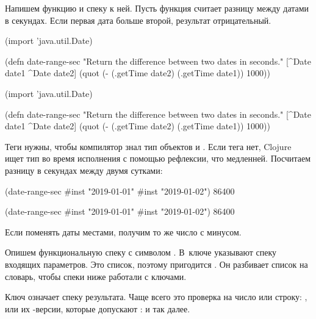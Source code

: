 
Напишем функцию и спеку к ней. Пусть функция считает разницу между датами в
секундах. Если первая дата больше второй, результат отрицательный.

\ifnarrow

\begin{clojure}
(import 'java.util.Date)

(defn date-range-sec
  "Return the difference
           between two dates in seconds."
  [^Date date1 ^Date date2]
  (quot (- (.getTime date2)
           (.getTime date1))
        1000))
\end{clojure}

\else

\begin{clojure}
(import 'java.util.Date)

(defn date-range-sec
  "Return the difference between two dates in seconds."
  [^Date date1 ^Date date2]
  (quot (- (.getTime date2)
           (.getTime date1))
        1000))
\end{clojure}

\fi

Теги  нужны, чтобы компилятор знал тип объектов  и
. Если тега нет, Clojure ищет тип во время исполнения с помощью
рефлексии, что медленней. Посчитаем разницу в секундах между двумя сутками:

\ifnarrow

\begin{clojure}
(date-range-sec #inst "2019-01-01"
                #inst "2019-01-02")
86400
\end{clojure}

\else

\begin{clojure}
(date-range-sec #inst "2019-01-01" #inst "2019-01-02")
86400
\end{clojure}

\fi

\noindent
Если поменять даты местами, получим то же число с минусом.

Опишем функциональную спеку с символом . В~ключе
 указывают спеку входящих параметров. Это список, поэтому пригодится
. Он разбивает список на словарь, чтобы спеки ниже работали с
ключами.

Ключ  означает спеку результата. Чаще всего это проверка на число или
строку: ,  или их -версии, которые
допускают :  и так далее.


